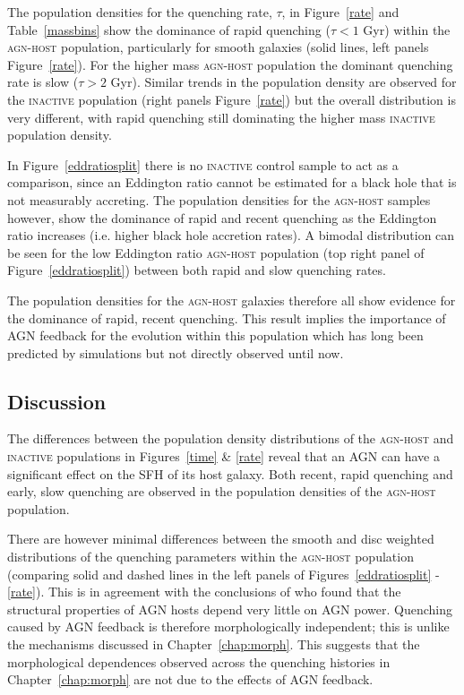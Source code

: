 The population densities for the quenching rate, $\tau$, in Figure~\ref{rate} and Table~\ref{massbins} show the dominance of rapid quenching ($\tau < 1$ Gyr) within the \textsc{agn-host} population, particularly for smooth galaxies (solid lines, left panels Figure~\ref{rate}). For the higher mass \textsc{agn-host} population the dominant quenching rate is slow ($\tau > 2$ Gyr). Similar trends in the population density are observed for the \textsc{inactive} population (right panels Figure~\ref{rate}) but the overall distribution is very different, with rapid quenching still dominating the higher mass \textsc{inactive} population density. 

In Figure~\ref{eddratiosplit} there is no \textsc{inactive} control sample to act as a comparison, since an Eddington ratio cannot be estimated for a black hole that is not measurably accreting. The population densities for the \textsc{agn-host} samples however, show the dominance of rapid and recent quenching as the Eddington ratio increases (i.e. higher black hole accretion rates). A bimodal distribution can be seen for the low Eddington ratio \textsc{agn-host} population (top right panel of Figure~\ref{eddratiosplit}) between both rapid and slow quenching rates. 

The population densities for the \textsc{agn-host} galaxies therefore all show evidence for the dominance of rapid, recent quenching. This result implies the importance of AGN feedback for the evolution within this population which has long been predicted by simulations but not directly observed until now.

\subsection{Discussion}\label{sec:agndis}

The differences between the population density distributions of the \textsc{agn-host} and \textsc{inactive} populations in Figures~\ref{time} \& \ref{rate} reveal that an AGN can have a significant effect on the SFH of its host galaxy. Both recent, rapid quenching and early, slow quenching are observed in the population densities of the \textsc{agn-host} population. 

There are however minimal differences between the smooth and disc weighted distributions of the quenching parameters within the \textsc{agn-host} population (comparing solid and dashed lines in the left panels of Figures~\ref{eddratiosplit} - \ref{rate}). This is in agreement with the conclusions of \citet{kauffmann03b} who found that the structural properties of AGN hosts depend very little on AGN power. Quenching caused by AGN feedback is therefore morphologically independent; this is unlike the mechanisms discussed in Chapter~\ref{chap:morph}. This suggests that the morphological dependences observed across the quenching histories in Chapter~\ref{chap:morph} are not due to the effects of AGN feedback. 


